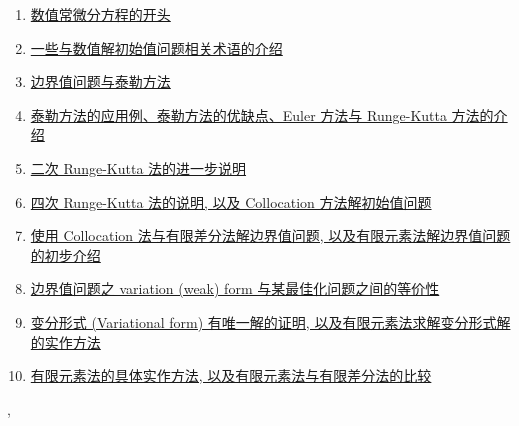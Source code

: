 \documentclass[11pt]{article}
\renewcommand{\today}{\shortmonthname[\the\month] \the \day,  \the\year}
\begin{document}
\vspace{-0.5cm}

\begin{enumerate}
	\item \href{https://mp.weixin.qq.com/s/LsOSiuGwMfshC2-MLdtcTQ}{数值常微分方程的开头} %
	\item \href{https://mp.weixin.qq.com/s/cFdYrdVeGDyufepzMWEQ6g}{一些与数值解初始值问题相关术语的介绍} %
	\item \href{https://mp.weixin.qq.com/s/_-lV7xTYv-K41S7d1Vmfzg}{边界值问题与泰勒方法} %
	\item \href{https://mp.weixin.qq.com/s/a5ATswmXkS09zUvdHNujKw}{泰勒方法的应用例、泰勒方法的优缺点、Euler 方法与 Runge-Kutta 方法的介绍} %
	\item \href{https://mp.weixin.qq.com/s/gbq2xZo0jqZ0jQ-2vnOXfQ}{二次 Runge-Kutta 法的进一步说明} %
	\item \href{https://mp.weixin.qq.com/s/ELvdgDQTA2dQeHpYWv_nkw}{四次 Runge-Kutta 法的说明, 以及 Collocation 方法解初始值问题} %
	\item \href{https://mp.weixin.qq.com/s/gc6q0p2EACGvNzDXNklTxA}{使用 Collocation 法与有限差分法解边界值问题, 以及有限元素法解边界值问题的初步介绍} %
	\item \href{https://mp.weixin.qq.com/s/59iaE1-wromc-jhfjmIG_w}{边界值问题之 variation (weak) form 与某最佳化问题之间的等价性} %
	\item \href{https://mp.weixin.qq.com/s/3UN0pPcz7JIF1_nB5com7g}{变分形式 (Variational form) 有唯一解的证明, 以及有限元素法求解变分形式解的实作方法} %
	\item \href{https://mp.weixin.qq.com/s/68LooYSsgRt48UIw3Ve0Yw}{有限元素法的具体实作方法, 以及有限元素法与有限差分法的比较} %
\end{enumerate}



%
\begin{flushright}
	\tiny \today 
\end{flushright}
\end{document}
